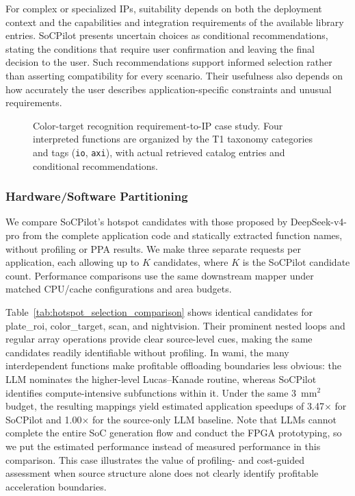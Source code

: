 For complex or specialized IPs, suitability depends on both the deployment context and the capabilities and integration requirements of the available library entries. SoCPilot presents uncertain choices as conditional recommendations, stating the conditions that require user confirmation and leaving the final decision to the user. Such recommendations support informed selection rather than asserting compatibility for every scenario. Their usefulness also depends on how accurately the user describes application-specific constraints and unusual requirements.

\begin{figure}[t]
\centering

\caption{Color-target recognition requirement-to-IP case study. Four interpreted functions are organized by the T1 taxonomy categories and tags (\texttt{io}, \texttt{axi}), with actual retrieved catalog entries and conditional recommendations.}
\label{fig:ip_selection_case}
\vspace{-6pt}
\end{figure}

\subsubsection{Hardware/Software Partitioning}
\label{subsec:hotspot_selection_comparison}
We compare SoCPilot's hotspot candidates with those proposed by DeepSeek-v4-pro from the complete application code and statically extracted function names, without profiling or PPA results. We make three separate requests per application, each allowing up to $K$ candidates, where $K$ is the SoCPilot candidate count. Performance comparisons use the same downstream mapper under matched CPU/cache configurations and area budgets.



Table~\ref{tab:hotspot_selection_comparison} shows identical candidates for plate\_roi, color\_target, scan, and nightvision. Their prominent nested loops and regular array operations provide clear source-level cues, making the same candidates readily identifiable without profiling. In wami, the many interdependent functions make profitable offloading boundaries less obvious: the LLM nominates the higher-level Lucas--Kanade routine, whereas SoCPilot identifies compute-intensive subfunctions within it. Under the same 3~mm$^2$ budget, the resulting mappings yield estimated application speedups of 3.47$\times$ for SoCPilot and 1.00$\times$ for the source-only LLM baseline. Note that LLMs cannot complete the entire SoC generation flow and conduct the FPGA prototyping, so we put the estimated performance instead of measured performance in this comparison. This case illustrates the value of profiling- and cost-guided assessment when source structure alone does not clearly identify profitable acceleration boundaries.

